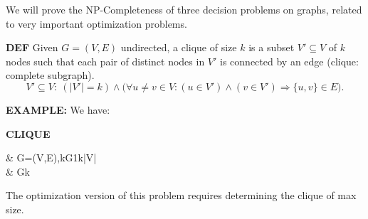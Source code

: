 We will prove the NP-Completeness of three decision problems on graphs, related to very important optimization problems.

\begin{notesdefinition}
\textbf{DEF} Given $G=(V,E)$ undirected, a clique of size $k$ is a subset $V'\subseteq V$ of $k$ nodes such that each pair of distinct nodes in $V'$ is connected by an edge (clique: complete subgraph).
\[
V'\subseteq V:\ (|V'|=k)\land\bigl(\forall u\neq v\in V:(u\in V')\land(v\in V')\Rightarrow\{u,v\}\in E\bigr).
\]
\end{notesdefinition}

\textbf{EXAMPLE:}
We have:

\textbf{CLIQUE}

\begin{notesproblem}
 & \langle G=(V,E),k\rangle\text{, }G1\leq k\leq|V|\\
 & Gk
\end{notesproblem}

The optimization version of this problem requires determining the clique of max size.

